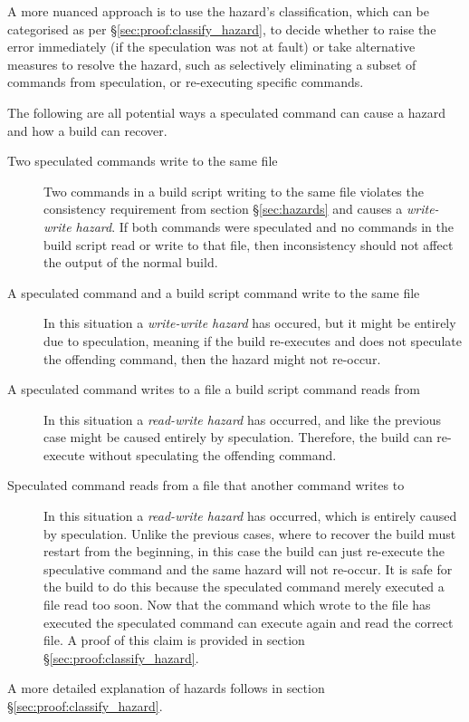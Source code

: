 A more nuanced approach is to use the hazard's classification, which can be categorised as per \S\ref{sec:proof:classify_hazard}, to decide whether to raise the error immediately (if the speculation was not at fault) or take alternative measures to resolve the hazard, such as selectively eliminating a subset of commands from speculation, or re-executing specific commands.

The following are all potential ways a speculated command can cause a hazard and how a build can recover.

\begin{description}
\item [Two speculated commands write to the same file]
  Two commands in a build script writing to the same file violates the consistency requirement from section \S\ref{sec:hazards} and causes a \emph{write-write hazard}.  If both commands were speculated and no commands in the build script read or write to that file, then inconsistency should not affect the output of the normal build.

\item [A speculated command and a build script command write to the same file]
  In this situation a \emph{write-write hazard} has occured, but it might be entirely due to speculation, meaning if the build re-executes and does not speculate the offending command, then the hazard might not re-occur.

\item [A speculated command writes to a file a build script command reads from]
  In this situation a \emph{read-write hazard} has occurred, and like the previous case might be caused entirely by speculation.  Therefore, the build can re-execute without speculating the offending command.

\item [Speculated command reads from a file that another command writes to]
  In this situation a \emph{read-write hazard} has occurred, which is entirely caused by speculation.  Unlike the previous cases, where to recover the build must restart from the beginning, in this case the build can just re-execute the speculative command and the same hazard will not re-occur.  It is safe for the build to do this because the speculated command merely executed a file read too soon.  Now that the command which wrote to the file has executed the speculated command can execute again and read the correct file.  A proof of this claim is provided in section \S\ref{sec:proof:classify_hazard}.

\end{description}

  A more detailed explanation of hazards follows in section \S\ref{sec:proof:classify_hazard}.


